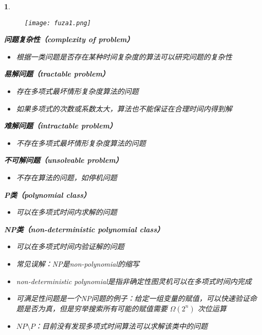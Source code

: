 \documentclass[UTF8]{report}
\theoremstyle{MyLineTheoremStyle} %
\theoremstyle{MyBlockTheoremStyle} %
\theoremstyle{MySubsubsectionStyle} %
\newtheorem{definition}{}
\begin{document}
\begin{definition}
    \begin{figure}[ht]
        \centering
        \texttt{[image: fuza1.png]}
    \end{figure}
    \textbf{问题复杂性（complexity of problem）}
    \begin{itemize}
        \item 根据一类问题是否存在某种时间复杂度的算法可以研究问题的复杂性
    \end{itemize}

    \textbf{易解问题（tractable problem）}
    \begin{itemize}
        \item 存在多项式最坏情形复杂度算法的问题
        \item 如果多项式的次数或系数太大，算法也不能保证在合理时间内得到解
    \end{itemize}

    \textbf{难解问题（intractable problem）}
    \begin{itemize}
        \item 不存在多项式最坏情形复杂度算法的问题
    \end{itemize}

    \textbf{不可解问题（unsolvable problem）}
    \begin{itemize}
        \item 不存在算法的问题，如停机问题
    \end{itemize}

    \textbf{P类（polynomial class）}
    \begin{itemize}
        \item 可以在多项式时间内求解的问题
    \end{itemize}

    \textbf{NP类（non-deterministic polynomial class）}
    \begin{itemize}
        \item 可以在多项式时间内验证解的问题
        \item 常见误解：NP是non-polynomial的缩写
        \item non-deterministic polynomial是指非确定性图灵机可以在多项式时间内完成
        \item 可满足性问题是一个NP问题的例子：给定一组变量的赋值，可以快速验证命题是否为真，但是穷举搜索所有可能的赋值需要 $\Omega(2^n)$ 次位运算
        \item $NP \setminus P$：目前没有发现多项式时间算法可以求解该类中的问题
    \end{itemize}


\end{definition}
\end{document}
